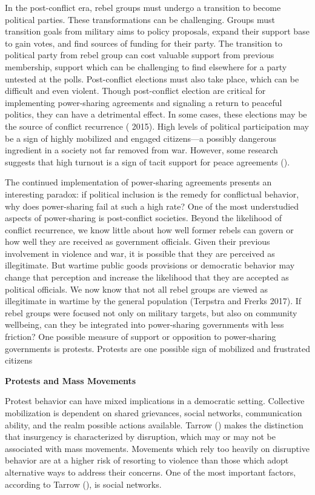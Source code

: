 \documentclass[12pt,]{article}
\begin{document}
In the post-conflict era, rebel groups must undergo a transition to
become political parties. These transformations can be challenging.
Groups must transition goals from military aims to policy proposals,
expand their support base to gain votes, and find sources of funding for
their party. The transition to political party from rebel group can cost
valuable support from previous membership, support which can be
challenging to find elsewhere for a party untested at the polls.
Post-conflict elections must also take place, which can be difficult and
even violent. Though post-conflict election are critical for
implementing power-sharing agreements and signaling a return to peaceful
politics, they can have a detrimental effect. In some cases, these
elections may be the source of conflict recurrence
(\citet{keels_oil_nodate} 2015). High levels of political participation
may be a sign of highly mobilized and engaged citizens---a possibly
dangerous ingredient in a society not far removed from war. However,
some research suggests that high turnout is a sign of tacit support for
peace agreements (\citet{letsa_voting_2017}).

The continued implementation of power-sharing agreements presents an
interesting paradox: if political inclusion is the remedy for
conflictual behavior, why does power-sharing fail at such a high rate?
One of the most understudied aspects of power-sharing is post-conflict
societies. Beyond the likelihood of conflict recurrence, we know little
about how well former rebels can govern or how well they are received as
government officials. Given their previous involvement in violence and
war, it is possible that they are perceived as illegitimate. But wartime
public goods provisions or democratic behavior may change that
perception and increase the likelihood that they are accepted as
political officials. We now know that not all rebel groups are viewed as
illegitimate in wartime by the general population (Terpstra and Frerks
2017). If rebel groups were focused not only on military targets, but
also on community wellbeing, can they be integrated into power-sharing
governments with less friction? One possible measure of support or
opposition to power-sharing governments is protests. Protests are one
possible sign of mobilized and frustrated citizens

\textbf{Protests and Mass Movements}

Protest behavior can have mixed implications in a democratic setting.
Collective mobilization is dependent on shared grievances, social
networks, communication ability, and the realm possible actions
available. Tarrow (\citet{tarrow_power_2011}) makes the distinction that
insurgency is characterized by disruption, which may or may not be
associated with mass movements. Movements which rely too heavily on
disruptive behavior are at a higher risk of resorting to violence than
those which adopt alternative ways to address their concerns. One of the
most important factors, according to Tarrow (\citet{tarrow_power_2011}),
is social networks.
\end{document}
